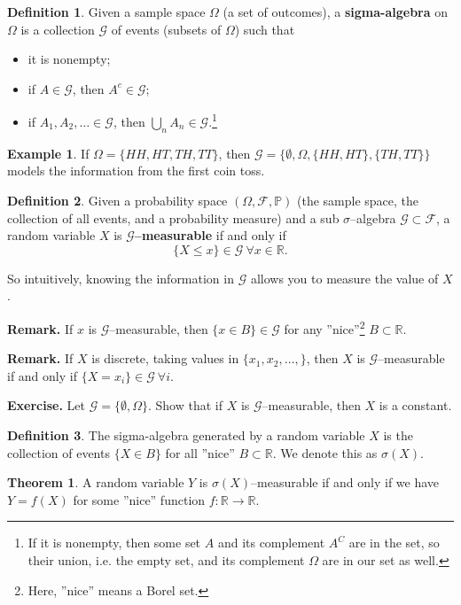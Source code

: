 \documentclass{article}
\theoremstyle{definition}
\newtheorem{theorem}{Theorem}[section]
\newtheorem{example}{Example}[section]
\newtheorem{defn}{Definition}[section]
\begin{document}
\begin{defn}
    Given a sample space $\Omega$ (a set of outcomes), a \textbf{sigma-algebra}  on $\Omega$ is a collection $\mathcal{G}$ of events (subsets of $\Omega$) such that
    \begin{itemize}
        \item it is nonempty;
        \item if $A \in \mathcal{G}$, then $A^c \in \mathcal{G}$;
        \item if $A_1,A_2,\ldots \in \mathcal{G}$, then $\bigcup_{n} A_n \in \mathcal{G}$.\footnote{If it is nonempty, then some set $A$ and its complement $A^C$ are in the set, so their union, i.e. the empty set,    and its complement $\Omega$ are in our set as well.}
    \end{itemize} 
\end{defn}
\begin{example}
    If $\Omega = \{HH,HT,TH,TT\}$, then $\mathcal{G} = \{\emptyset, \Omega, \{HH,HT\}, \{TH,TT\}\}$ models the information from the first coin toss.
\end{example}
\begin{defn}
    Given a probability space $(\Omega, \mathcal{F}, \mathbb{P})$ (the sample space, the collection of all events, and a probability measure) and a sub $\sigma$--algebra $\mathcal{G} \subset \mathcal{F}$, a random variable $X$ is \textbf{$\mathcal{G}$--measurable}  if and only if $$\{X \le x\} \in \mathcal{G} ~\forall x \in \mathbb{R}.$$
\end{defn}
So intuitively, knowing the information in $\mathcal{G}$ allows you to measure the value of $X$.

\textbf{Remark.} If $x$ is $\mathcal{G}$--measurable, then $\{x \in B\} \in \mathcal{G}$ for any ''nice''\footnote{Here, ''nice'' means a Borel set.} $B \subset \mathbb{R}$.

\textbf{Remark.} If $X$ is discrete, taking values in $\{x_1,x_2,\ldots,\}$, then $X$ is $\mathcal{G}$--measurable if and only if $\{X = x_i\} \in \mathcal{G} ~\forall i$.

\textbf{Exercise.} Let $\mathcal{G} = \{\emptyset, \Omega\}$. Show that if $X$ is $\mathcal{G}$--measurable, then $X$ is a constant.
\begin{defn}
    The sigma-algebra generated by a random variable $X$ is the collection of events $\{X \in B\}$ for all ''nice'' $B \subset \mathbb{R}$. We denote this as $\sigma(X)$.
\end{defn}
\begin{theorem}
    A random variable $Y$ is $\sigma(X)$--measurable if and only if we have $Y=f(X)$ for some ''nice'' function $f : \mathbb{R} \to \mathbb{R}$.
\end{theorem}
\end{document}
